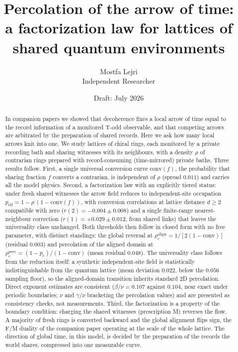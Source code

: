\documentclass[11pt]{article}
\title{Percolation of the arrow of time:\\
a factorization law for lattices of shared quantum environments}
\author{Mostfa Lejri\\ \small Independent Researcher}
\date{\small Draft: July 2026}
\newcommand{\peff}{p_{\mathrm{eff}}}
\newcommand{\conv}{\mathrm{conv}}
\newcommand{\rhoalign}{\rho_c^{\mathrm{align}}}
\newcommand{\rhoperc}{\rho_c^{\mathrm{perc}}}
\begin{document}
\maketitle

\begin{abstract}
In companion papers we showed that decoherence fixes a local arrow of time
equal to the record information of a monitored T-odd observable, and that
competing arrows are arbitrated by the preparation of shared records. Here we
ask how many local arrows knit into one. We study lattices of chiral rings,
each monitored by a private recording bath and sharing witnesses with its
neighbours, with a density $\rho$ of contrarian rings prepared with
record-consuming (time-mirrored) private baths. Three results follow. First,
a single universal conversion curve $\conv(f)$, the probability that sharing
fraction $f$ converts a contrarian, is independent of $\rho$ (spread $0.011$)
and carries all the model physics. Second, a factorization law with an explicitly tiered status: under fresh
shared witnesses the arrow field reduces to independent-site occupation
$\peff = 1-\rho\,(1-\conv(f))$, with conversion correlations at lattice
distance $d\ge 2$ compatible with zero ($r(2)=-0.004\pm0.008$) and a single
finite-range nearest-neighbour correction ($r(1)=+0.029\pm0.012$, from shared
links) that leaves the universality class unchanged.
Both thresholds then follow in closed form with no
free parameter, with distinct standings: the global reversal at $\rhoalign = 1/[2(1-\conv)]$ (residual $0.003$) and percolation
of the aligned domain at $\rhoperc = (1-p_c)/(1-\conv)$ (mean residual
$0.048$). The universality class follows from the reduction itself: a
synthetic independent-site field is statistically indistinguishable from the
quantum lattice (mean deviation $0.022$, below the $0.056$ sampling floor),
so the aligned-domain transition inherits standard 2D percolation. Direct
exponent estimates are consistent ($\beta/\nu = 0.107$ against $0.104$, near
exact under periodic boundaries; $\nu$ and $\gamma/\nu$ bracketing the
percolation values) and are presented as consistency checks, not measurements. Third, the
factorization is a property of the boundary condition: charging the shared
witnesses (prescription M) reverses the flow. A majority of fresh rings is
converted backward and the global alignment flips sign, the F/M duality of
the companion paper operating at the scale of the whole lattice. The
direction of global time, in this model, is decided by the preparation of
the records the world shares, compressed into one measurable curve.
\end{abstract}
\end{document}

